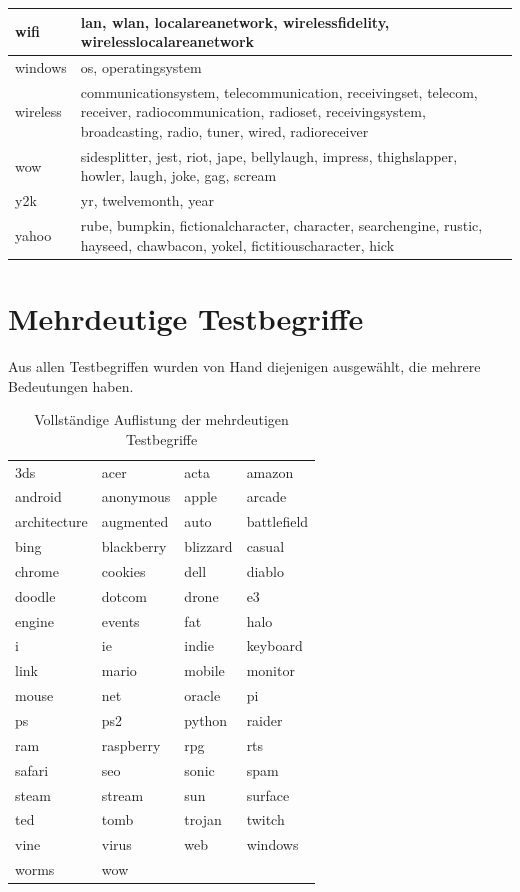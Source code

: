 \documentclass[12pt,a4paper]{report}
\begin{document}
\begin{table}[H]
\begin{center}
\begin{tabular}{ |l|p{14cm}|}
\hline
wifi & lan, wlan, localareanetwork, wirelessfidelity, wirelesslocalareanetwork\\
\hline
windows & os, operatingsystem\\
\hline
wireless & communicationsystem, telecommunication, receivingset, telecom, receiver, radiocommunication, radioset, receivingsystem, broadcasting, radio, tuner, wired, radioreceiver\\
\hline
wow & sidesplitter, jest, riot, jape, bellylaugh, impress, thighslapper, howler, laugh, joke, gag, scream\\
\hline
y2k & yr, twelvemonth, year\\
\hline
yahoo & rube, bumpkin, fictionalcharacter, character, searchengine, rustic, hayseed, chawbacon, yokel, fictitiouscharacter, hick\\
\hline


\end{tabular}
\end{center}
\end{table}

\fi
\newpage
\section{Mehrdeutige Testbegriffe}
\label{sec:mehrdeutigetestbegriffe}
Aus allen Testbegriffen wurden von Hand diejenigen ausgewählt, die mehrere Bedeutungen haben.
\begin{table}[H]
\caption{Vollständige Auflistung der mehrdeutigen Testbegriffe}
\begin{center}
\begin{tabular}{l|l|l|l}\\
3ds & acer & acta & amazon\\
android & anonymous & apple & arcade\\
architecture & augmented & auto & battlefield\\
bing & blackberry & blizzard & casual\\
chrome & cookies & dell & diablo\\
doodle & dotcom & drone & e3\\
engine & events & fat & halo\\
i & ie & indie & keyboard\\
link & mario & mobile & monitor\\
mouse & net & oracle & pi\\
ps & ps2 & python & raider\\
ram & raspberry & rpg & rts\\
safari & seo & sonic & spam\\
steam & stream & sun & surface\\
ted & tomb & trojan & twitch\\
vine & virus & web & windows\\
worms & wow &  & \\

\end{tabular}
\end{center}
\end{table}
	
\end{document}

